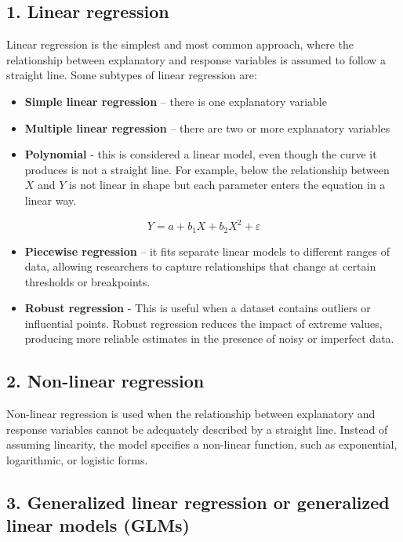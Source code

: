 \documentclass[
]{book}
\providecommand{\tightlist}{%
  \setlength{\itemsep}{0pt}\setlength{\parskip}{0pt}}
\begin{document}
\subsection{1. Linear regression}\label{linear-regression}

Linear regression is the simplest and most common approach, where the relationship between explanatory and response variables is assumed to follow a straight line. Some subtypes of linear regression are:

\begin{itemize}
\tightlist
\item
  \textbf{Simple linear regression} -- there is one explanatory variable
\item
  \textbf{Multiple linear regression} -- there are two or more explanatory variables
\item
  \textbf{Polynomial} - this is considered a linear model, even though the curve it produces is not a straight line. For example, below the relationship between \(X\) and \(Y\) is not linear in shape but each parameter enters the equation in a linear way.
\end{itemize}

\[Y = a + b_1 X + b_2 X^2 + \varepsilon\]

\begin{itemize}
\tightlist
\item
  \textbf{Piecewise regression} -- it fits separate linear models to different ranges of data, allowing researchers to capture relationships that change at certain thresholds or breakpoints.
\item
  \textbf{Robust regression} - This is useful when a dataset contains outliers or influential points. Robust regression reduces the impact of extreme values, producing more reliable estimates in the presence of noisy or imperfect data.
\end{itemize}

\subsection{2. Non-linear regression}\label{non-linear-regression}

Non-linear regression is used when the relationship between explanatory and response variables cannot be adequately described by a straight line. Instead of assuming linearity, the model specifies a non-linear function, such as exponential, logarithmic, or logistic forms.

\subsection{3. Generalized linear regression or generalized linear models (GLMs)}\label{generalized-linear-regression-or-generalized-linear-models-glms}
\end{document}
